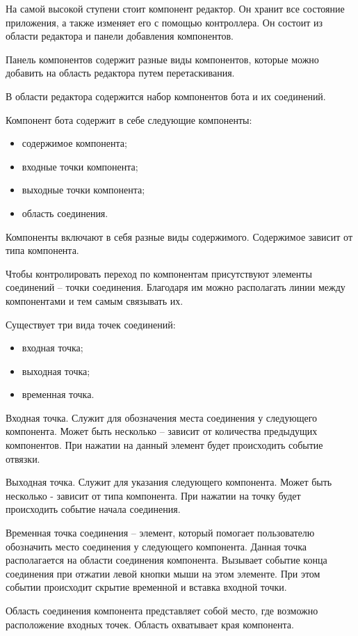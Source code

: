 На самой высокой ступени стоит компонент редактор. Он хранит все
состояние приложения, а также изменяет его с помощью контроллера. Он
состоит из области редактора и панели добавления компонентов.

Панель компонентов содержит разные виды компонентов, которые
можно добавить на область редактора путем перетаскивания.

В области редактора содержится набор компонентов бота и их
соединений.

Компонент бота содержит в себе следующие компоненты:
\begin{itemize}
	\item содержимое компонента;
	\item входные точки компонента;
	\item выходные точки компонента;
	\item область соединения.
\end{itemize}

Компоненты включают в себя разные виды содержимого. Содержимое
зависит от типа компонента.

Чтобы контролировать переход по компонентам присутствуют
элементы соединений – точки соединения. Благодаря им можно располагать
линии между компонентами и тем самым связывать их.

Существует три вида точек соединений:
\begin{itemize}
	\item входная точка;
	\item выходная точка;
	\item временная точка.
\end{itemize}

Входная точка. Служит для обозначения места соединения у
следующего компонента. Может быть несколько – зависит от количества
предыдущих компонентов. При нажатии на данный элемент будет
происходить событие отвязки.

Выходная точка. Служит для указания следующего компонента. Может
быть несколько - зависит от типа компонента. При нажатии на точку будет
происходить событие начала соединения.

Временная точка соединения – элемент, который помогает
пользователю обозначить место соединения у следующего компонента.
Данная точка располагается на области соединения компонента. Вызывает
событие конца соединения при отжатии левой кнопки мыши на этом элементе.
При этом событии происходит скрытие временной и вставка входной точки.

Область соединения компонента представляет собой место, где
возможно расположение входных точек. Область охватывает края
компонента.


